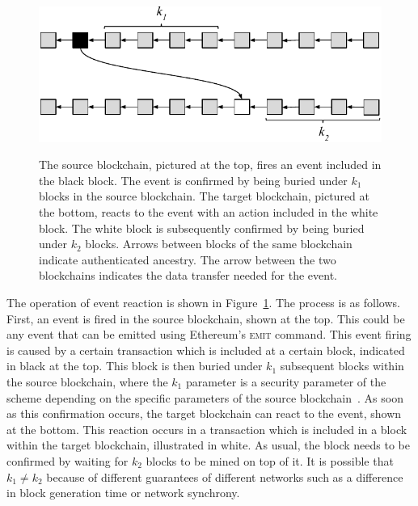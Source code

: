 \begin{figure}
    \caption{The source blockchain, pictured at the top, fires an event
             included in the black block. The event is confirmed by being buried
             under $k_1$ blocks in the source blockchain. The target blockchain,
             pictured at the bottom, reacts to the event with an action included
             in the white block. The white block is subsequently confirmed by
             being buried under $k_2$ blocks. Arrows between blocks of the same
             blockchain indicate authenticated ancestry. The arrow between the
             two blockchains indicates the data transfer needed for the event.}
    \centering
    \includegraphics[width=0.7 \columnwidth,keepaspectratio]{figures/events.pdf}
    \label{fig.events}
\end{figure}

The operation of event reaction is shown in Figure~\ref{fig.events}. The process
is as follows. First, an event is fired in the source blockchain, shown at the
top. This could be any event that can be emitted using Ethereum's \textsc{emit}
command. This event firing is caused by a certain transaction which is included
at a certain block, indicated in black at the top. This block is then buried
under $k_1$ subsequent blocks within the source blockchain, where the $k_1$
parameter is a security parameter of the scheme depending on the specific
parameters of the source blockchain~\cite{EC:GarKiaLeo15}. As soon as this
confirmation occurs, the target blockchain can react to the event, shown at the
bottom. This reaction occurs in a transaction which is included in a block
within the target blockchain, illustrated in white. As usual, the block needs to
be confirmed by waiting for $k_2$ blocks to be mined on top of it. It is
possible that $k_1 \neq k_2$ because of different guarantees of different
networks such as a difference in block generation time or network synchrony.

